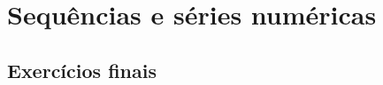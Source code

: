
\chapter{Sequências e séries numéricas}\label{cap:sequencias_e_series_numericas}

\emconstrucao

\section{Exercícios finais}

\construirExer